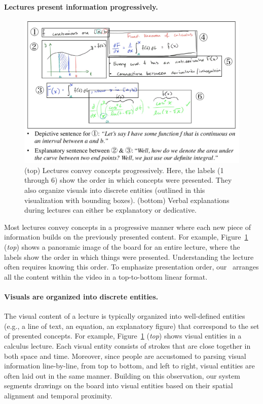 \paragraph{Lectures present information progressively.}
\begin{figure}[t!]
    \centering
        \includegraphics[width=\textwidth]{figures/keyideas.pdf}
    \caption{(top) Lectures convey concepts progressively. Here, the labels (1 through 6) show the order in which concepts were presented. They also organize visuals into discrete entities (outlined in this visualization with bounding boxes). (bottom) Verbal explanations during lectures can either be explanatory or dedicative.}
    \label{Fig:key_ideas}
\end{figure}
%
Most lectures convey concepts in a progressive manner where each new piece of information builds on the previously presented content.
For example, Figure~\ref{Fig:key_ideas} (\textit{top}) shows a panoramic image of the board for an entire lecture, where the labels show the order in which things were presented. Understanding the lecture often requires knowing this order.
%
To emphasize presentation order, our \systemname\ arranges all the content within the video in a top-to-bottom linear format.
%
\paragraph{Visuals are organized into discrete entities.} The visual content of a lecture is typically organized into well-defined entities (e.g., a line of text, an equation, an explanatory figure) that correspond to the set of presented concepts. 
%
For example, Figure~\ref{Fig:key_ideas} (\textit{top}) shows visual entities in a calculus lecture.   Each visual entity consists of strokes that are close together in both space and time. Moreover, since people are accustomed to parsing visual information line-by-line, from top to bottom, and left to right, visual entities are often laid out in the same manner. 
%
Building on this observation, our system segments drawings on the board into visual entities based on their spatial alignment and temporal proximity.
%
